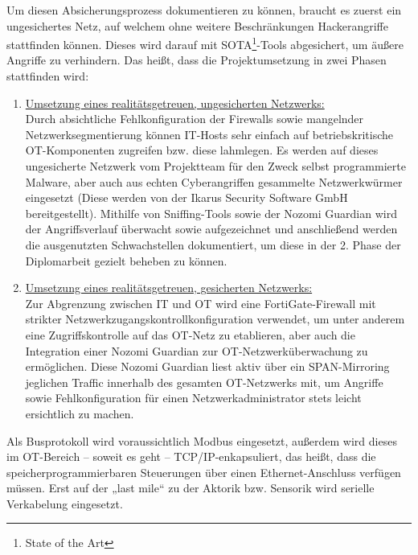 \documentclass[
	headings=optiontotocandhead,%
	oneside,
	numbers=noenddot,%
	toc=flat, %
	10pt, %
	parskip=full, %
	listof=totoc, %
	listof=flat, %
	numbers=noenddot, %
	bibliography=totoc, %
	a4paper,DIV=14,
]{scrartcl}
\begin{document}
Um diesen Absicherungsprozess dokumentieren zu können, braucht es zuerst ein ungesichertes Netz, auf welchem ohne weitere Beschränkungen Hackerangriffe stattfinden können. Dieses wird darauf mit SOTA\footnote{State of the Art}-Tools abgesichert, um äußere Angriffe zu verhindern. Das heißt, dass die Projektumsetzung in zwei Phasen stattfinden wird: \\

\begin{enumerate}
\item \underline{Umsetzung eines realitätsgetreuen, ungesicherten Netzwerks:}\\
Durch absichtliche Fehlkonfiguration der Firewalls sowie mangelnder Netzwerksegmentierung können IT-Hosts sehr einfach auf betriebskritische OT-Komponenten zugreifen bzw. diese lahmlegen. Es werden auf dieses ungesicherte Netzwerk vom Projektteam für den Zweck selbst programmierte Malware, aber auch aus echten Cyberangriffen gesammelte Netzwerkwürmer eingesetzt (Diese werden von der Ikarus Security Software GmbH bereitgestellt). Mithilfe von Sniffing-Tools sowie der Nozomi Guardian wird der Angriffsverlauf überwacht sowie aufgezeichnet und anschließend werden die ausgenutzten Schwachstellen dokumentiert, um diese in der 2. Phase der Diplomarbeit gezielt beheben zu können.

\item \underline{Umsetzung eines realitätsgetreuen, gesicherten Netzwerks:}\\
Zur Abgrenzung zwischen IT und OT wird eine FortiGate-Firewall mit strikter Netzwerkzugangskontrollkonfiguration verwendet, um unter anderem eine Zugriffskontrolle auf das OT-Netz zu etablieren, aber auch die Integration einer Nozomi Guardian zur OT-Netzwerküberwachung zu ermöglichen. Diese Nozomi Guardian liest aktiv über ein SPAN-Mirroring jeglichen Traffic innerhalb des gesamten OT-Netzwerks mit, um Angriffe sowie Fehlkonfiguration für einen Netzwerkadministrator stets leicht ersichtlich zu machen.

\end{enumerate}
Als Busprotokoll wird voraussichtlich Modbus eingesetzt, außerdem wird dieses im OT-Bereich – soweit es geht – TCP/IP-enkapsuliert, das heißt, dass die speicherprogrammierbaren Steuerungen über einen Ethernet-Anschluss verfügen müssen. Erst auf der „last mile“ zu der Aktorik bzw. Sensorik wird serielle Verkabelung eingesetzt.
\end{document}

